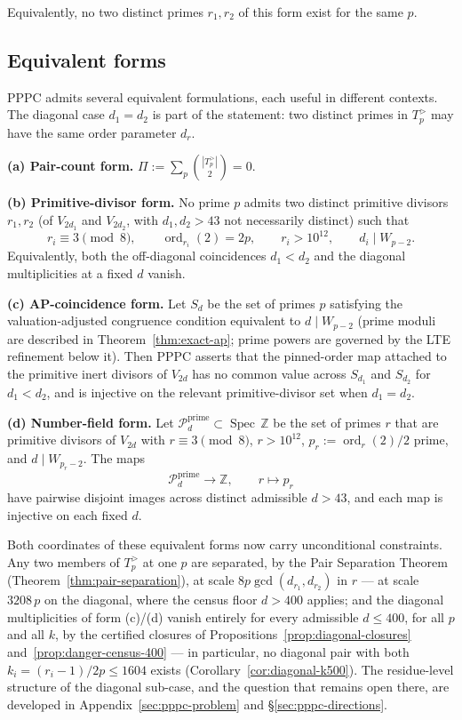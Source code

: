 \documentclass[11pt]{amsart}
\theoremstyle{plain}
\theoremstyle{definition}
\theoremstyle{remark}
\numberwithin{equation}{section}
\newcommand{\ord}{\operatorname{ord}}
\newcommand{\Spec}{\operatorname{Spec}}
\newcommand{\Z}{\mathbb{Z}}
\begin{document}
Equivalently, no two distinct primes $r_1, r_2$ of this form exist for the same $p$.

\subsection{Equivalent forms}\label{sec:equiv-forms}

PPPC admits several equivalent formulations, each useful in different contexts. The diagonal case $d_1=d_2$ is part of the statement: two distinct primes in $T_p^{>}$ may have the same order parameter $d_r$.

\textbf{(a) Pair-count form.} $\Pi := \sum_p \binom{|T_p^{>}|}{2} = 0$.

\textbf{(b) Primitive-divisor form.} No prime $p$ admits two distinct primitive divisors $r_1,r_2$ (of $V_{2d_1}$ and $V_{2d_2}$, with $d_1,d_2>43$ not necessarily distinct) such that
\[
  r_i \equiv 3 \pmod 8,\qquad \ord_{r_i}(2)=2p,\qquad
  r_i>10^{12},\qquad d_i\mid W_{p-2}.
\]
Equivalently, both the off-diagonal coincidences $d_1<d_2$ and the diagonal multiplicities at a fixed $d$ vanish.

\textbf{(c) AP-coincidence form.} Let $S_d$ be the set of primes $p$ satisfying the valuation-adjusted congruence condition equivalent to $d\mid W_{p-2}$ (prime moduli are described in Theorem~\ref{thm:exact-ap}; prime powers are governed by the LTE refinement below it). Then PPPC asserts that the pinned-order map attached to the primitive inert divisors of $V_{2d}$ has no common value across $S_{d_1}$ and $S_{d_2}$ for $d_1<d_2$, and is injective on the relevant primitive-divisor set when $d_1=d_2$.

\textbf{(d) Number-field form.} Let $\mathcal{P}_d^{\mathrm{prime}} \subset \Spec\,\Z$ be the set of primes $r$ that are primitive divisors of $V_{2 d}$ with $r \equiv 3 \pmod 8$, $r > 10^{12}$, $p_r:=\ord_r(2)/2$ prime, and $d\mid W_{p_r-2}$. The maps
\[
  \mathcal{P}_d^{\mathrm{prime}} \longrightarrow \Z,\qquad r \longmapsto p_r
\]
have pairwise disjoint images across distinct admissible $d>43$, and each map is injective on each fixed $d$.

Both coordinates of these equivalent forms now carry unconditional constraints. Any two members of $T_p^{>}$ at one $p$ are separated, by the Pair Separation Theorem (Theorem~\ref{thm:pair-separation}), at scale $8 p \gcd(d_{r_1}, d_{r_2})$ in $r$ --- at scale $3208\,p$ on the diagonal, where the census floor $d > 400$ applies; and the diagonal multiplicities of form (c)/(d) vanish entirely for every admissible $d \leq 400$, for all $p$ and all $k$, by the certified closures of Propositions~\ref{prop:diagonal-closures} and~\ref{prop:danger-census-400} --- in particular, no diagonal pair with both $k_i = (r_i - 1)/2p \leq 1604$ exists (Corollary~\ref{cor:diagonal-k500}). The residue-level structure of the diagonal sub-case, and the question that remains open there, are developed in Appendix~\ref{sec:pppc-problem} and \S\ref{sec:pppc-directions}.
\end{document}
